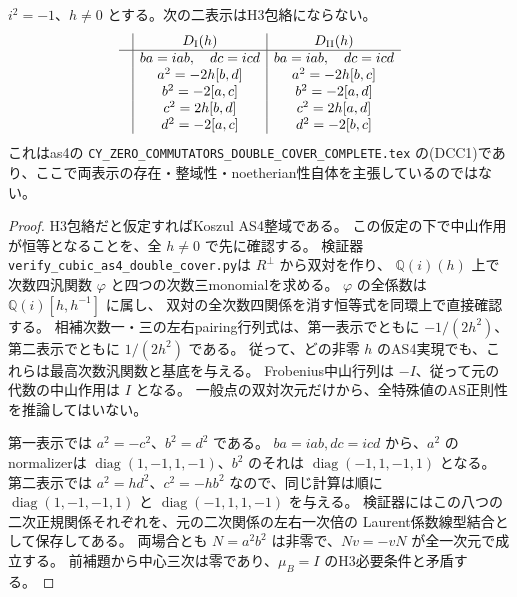 \begin{theorem}[二重被覆表示の全非零パラメータ排除]
\label{thm:as4-double-cover-h3-exclusion}
$i^2=-1$、$h\ne0$ とする。次の二表示はH3包絡にならない。
\[
\begin{array}{c|c|c}
 &D_{\mathrm I}(h)&D_{\mathrm{II}}(h)\\\hline
 &ba=iab,\quad dc=icd&ba=iab,\quad dc=icd\\
 &a^2=-2h[b,d]&a^2=-2h[b,c]\\
 &b^2=-2[a,c]&b^2=-2[a,d]\\
 &c^2=2h[b,d]&c^2=2h[a,d]\\
 &d^2=-2[a,c]&d^2=-2[b,c]
\end{array}
\]
これはas4の \texttt{CY\_ZERO\_COMMUTATORS\_DOUBLE\_COVER\_COMPLETE.tex}
の(DCC1)であり、ここで両表示の存在・整域性・noetherian性自体を主張しているのではない。
\end{theorem}
\begin{proof}
H3包絡だと仮定すればKoszul AS4整域である。
この仮定の下で中山作用が恒等となることを、全 $h\ne0$ で先に確認する。
検証器\texttt{verify\_cubic\_as4\_double\_cover.py}は $R^\perp$ から双対を作り、
$\mathbb Q(i)(h)$ 上で次数四汎関数 $\varphi$ と四つの次数三monomialを求める。
$\varphi$ の全係数は $\mathbb Q(i)[h,h^{-1}]$ に属し、
双対の全次数四関係を消す恒等式を同環上で直接確認する。
相補次数一・三の左右pairing行列式は、第一表示でともに $-1/(2h^2)$、
第二表示でともに $1/(2h^2)$ である。
従って、どの非零 $h$ のAS4実現でも、これらは最高次数汎関数と基底を与える。
Frobenius中山行列は $-I$、従って元の代数の中山作用は $I$ となる。
一般点の双対次元だけから、全特殊値のAS正則性を推論してはいない。

第一表示では $a^2=-c^2$、$b^2=d^2$ である。
$ba=iab,dc=icd$ から、$a^2$ のnormalizerは
$\operatorname{diag}(1,-1,1,-1)$、$b^2$ のそれは
$\operatorname{diag}(-1,1,-1,1)$ となる。
第二表示では $a^2=h d^2$、$c^2=-h b^2$ なので、同じ計算は順に
$\operatorname{diag}(1,-1,-1,1)$ と
$\operatorname{diag}(-1,1,1,-1)$ を与える。
検証器にはこの八つの二次正規関係それぞれを、元の二次関係の左右一次倍の
Laurent係数線型結合として保存してある。
両場合とも $N=a^2b^2$ は非零で、$Nv=-vN$ が全一次元で成立する。
前補題から中心三次は零であり、$\mu_B=I$ のH3必要条件と矛盾する。
\end{proof}

